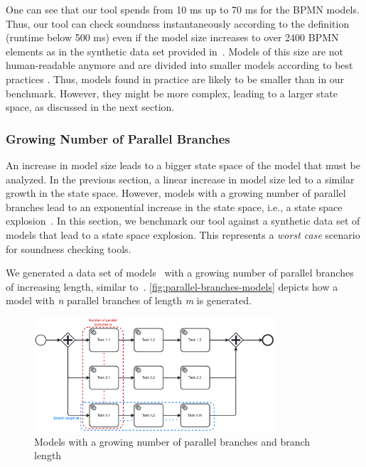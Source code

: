 \documentclass[runningheads]{llncs}
\begin{document}
One can see that our tool spends from 10 ms up to 70 ms for the BPMN models.
Thus, our tool can check soundness instantaneously according to the definition (runtime below 500 ms) even if the model size increases to over 2400 BPMN elements as in the synthetic data set provided in~\cite{krauterHigherorderTransformationApproach2023}.
Models of this size are not human-readable anymore and are divided into smaller models according to best practices \cite{fahlandAnalysisDemandInstantaneous2011}.
Thus, models found in practice are likely to be smaller than in our benchmark.
However, they might be more complex, leading to a larger state space, as discussed in the next section.

\subsubsection{Growing Number of Parallel Branches} \label{subsec:degrees-of-parallelism}
An increase in model size leads to a bigger state space of the model that must be analyzed.
In the previous section, a linear increase in model size led to a similar growth in the state space.
However, models with a growing number of parallel branches lead to an exponential increase in the state space, i.e., a state space explosion~\cite{valmariStateExplosionProblem1998}.
In this section, we benchmark our tool against a synthetic data set of models that lead to a state space explosion.
This represents a \textit{worst case} scenario for soundness checking tools.

We generated a data set of models~\cite{noauthorgivenBPM2024Artifacts2024} with a growing number of parallel branches of increasing length, similar to~\cite{corradiniFormalApproachAnalysis2021}.
\autoref{fig:parallel-branches-models} depicts how a model with \textit{n} parallel branches of length \textit{m} is generated.

\begin{figure}[ht]
	\centering
	\includegraphics[width=0.8\textwidth]{images/parallel-branches}
	\caption{Models with a growing number of parallel branches and branch length}
	\label{fig:parallel-branches-models}
\end{figure}
\end{document}
